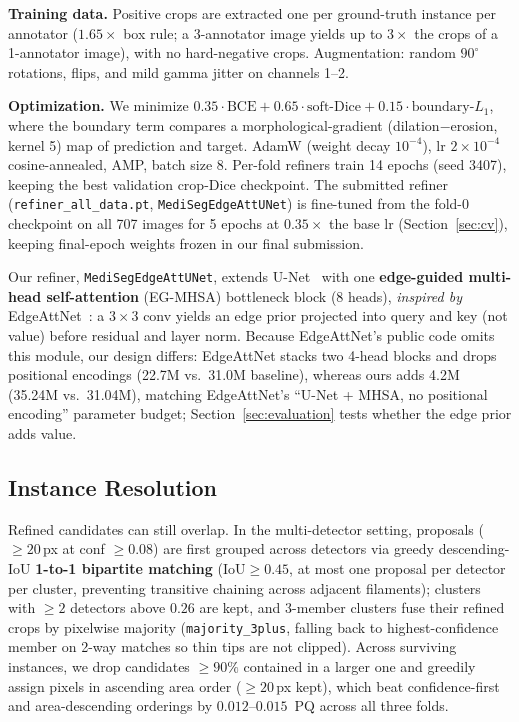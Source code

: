 \documentclass[sigconf]{acmart}
\begin{document}
    \textbf{Training data.} Positive crops are extracted one per ground-truth instance per annotator ($1.65\times$ box rule; a 3-annotator image yields up to $3\times$ the crops of a 1-annotator image), with no hard-negative crops. Augmentation: random $90^\circ$ rotations, flips, and mild gamma jitter on channels 1--2.

    \textbf{Optimization.} We minimize $0.35\cdot\text{BCE} + 0.65\cdot\text{soft-Dice} + 0.15\cdot\text{boundary-}L_1$, where the boundary term compares a morphological-gradient (dilation$-$erosion, kernel 5) map of prediction and target. AdamW (weight decay $10^{-4}$), lr $2{\times}10^{-4}$ cosine-annealed, AMP, batch size 8. Per-fold refiners train 14 epochs (seed 3407), keeping the best validation crop-Dice checkpoint. The submitted refiner (\texttt{refiner\_all\_data.pt}, \texttt{MediSegEdgeAttUNet}) is fine-tuned from the fold-0 checkpoint on all 707 images for 5 epochs at $0.35\times$ the base lr (Section~\ref{sec:cv}), keeping final-epoch weights frozen in our final submission.

    Our refiner, \texttt{MediSegEdgeAttUNet}, extends U-Net~\cite{ronneberger2015unet} with one \textbf{edge-guided multi-head self-attention} (EG-MHSA) bottleneck block (8 heads), \emph{inspired by} EdgeAttNet~\cite{edgeattnet2025}: a $3{\times}3$ conv yields an edge prior projected into query and key (not value) before residual and layer norm. Because EdgeAttNet's public code omits this module, our design differs: EdgeAttNet stacks two 4-head blocks and drops positional encodings (22.7M vs.\ 31.0M baseline), whereas ours adds 4.2M (35.24M vs.\ 31.04M), matching EdgeAttNet's ``U-Net + MHSA, no positional encoding'' parameter budget; Section~\ref{sec:evaluation} tests whether the edge prior adds value.

\subsection{Instance Resolution}
    Refined candidates can still overlap. In the multi-detector setting, proposals ($\ge\!20$\,px at conf $\ge\!0.08$) are first grouped across detectors via greedy descending-IoU \textbf{1-to-1 bipartite matching} ($\text{IoU}\ge 0.45$, at most one proposal per detector per cluster, preventing transitive chaining across adjacent filaments); clusters with $\ge\!2$ detectors above $0.26$ are kept, and 3-member clusters fuse their refined crops by pixelwise majority (\texttt{majority\_3plus}, falling back to highest-confidence member on 2-way matches so thin tips are not clipped). Across surviving instances, we drop candidates $\ge\!90\%$ contained in a larger one and greedily assign pixels in ascending area order ($\ge\!20$\,px kept), which beat confidence-first and area-descending orderings by $0.012$--$0.015$~PQ across all three folds.
\end{document}
